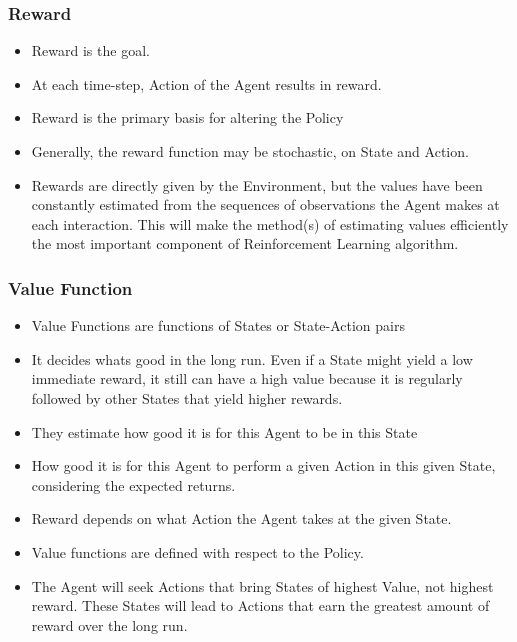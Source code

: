 \begin{frame}[fragile]\frametitle{Reward}

\begin{itemize}
\item Reward is the goal.
\item At each time-step, Action of the Agent results in reward.
\item Reward is the primary basis for altering the Policy
\item Generally, the reward function may be stochastic, on State and Action.
\item Rewards are directly given by the Environment, but the values have been constantly estimated from the sequences of observations the Agent makes at each interaction. This will make the method(s) of estimating values efficiently the most important component of Reinforcement Learning algorithm.
\end{itemize}

\end{frame}


\begin{frame}[fragile]\frametitle{Value Function}

\begin{itemize}
\item Value Functions are functions of States or State-Action pairs
\item It decides whats good in the long run. Even if a State might yield a low immediate reward, it still can have a high value because it is regularly followed by other States that yield higher rewards.
\item They estimate how good it is for this Agent to be in this State
\item How good it is for this Agent to perform a given Action in this given State, considering the expected returns.
\item Reward depends on what Action the Agent takes at the given State.
\item Value functions are defined with respect to the Policy.
\item The Agent will seek Actions that bring States of highest Value, not highest reward. These States will lead to Actions that earn the greatest amount of reward over the long run.
\end{itemize}

\end{frame}

